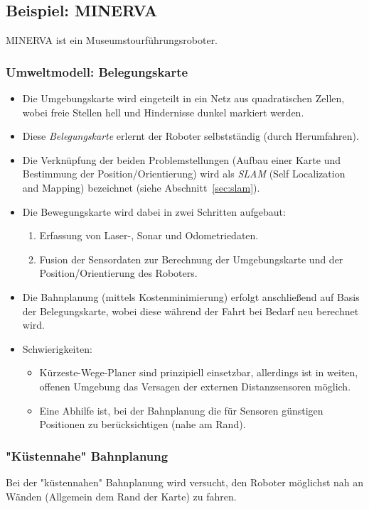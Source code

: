 		\subsection{Beispiel: MINERVA}
			MINERVA ist ein Museumstourführungsroboter.
			
			\subsubsection{Umweltmodell: Belegungskarte}
				\begin{itemize}
					\item Die Umgebungskarte wird eingeteilt in ein Netz aus quadratischen Zellen, wobei freie Stellen hell und Hindernisse dunkel markiert werden.
					\item Diese \emph{Belegungskarte} erlernt der Roboter selbstständig (durch Herumfahren).
					\item Die Verknüpfung der beiden Problemstellungen (Aufbau einer Karte und Bestimmung der Position/Orientierung) wird als \emph{SLAM} (Self Localization and Mapping) bezeichnet (siehe Abschnitt~\ref{sec:slam}).
					\item Die Bewegungskarte wird dabei in zwei Schritten aufgebaut:
						\begin{enumerate}
							\item Erfassung von Laser-, Sonar und Odometriedaten.
							\item Fusion der Sensordaten zur Berechnung der Umgebungskarte und der Position/Orientierung des Roboters.
						\end{enumerate}
					\item Die Bahnplanung (mittels Kostenminimierung) erfolgt anschließend auf Basis der Belegungskarte, wobei diese während der Fahrt bei Bedarf neu berechnet wird.
					\item Schwierigkeiten:
						\begin{itemize}
							\item Kürzeste-Wege-Planer sind prinzipiell einsetzbar, allerdings ist in weiten, offenen Umgebung das Versagen der externen Distanzsensoren möglich.
							\item Eine Abhilfe ist, bei der Bahnplanung die für Sensoren günstigen Positionen zu berücksichtigen (\zB nahe am Rand).
						\end{itemize}
				\end{itemize}

			\subsubsection{"Küstennahe" Bahnplanung}
				Bei der "küstennahen" Bahnplanung wird versucht, den Roboter möglichst nah an Wänden (\bzw Allgemein dem Rand der Karte) zu fahren.

